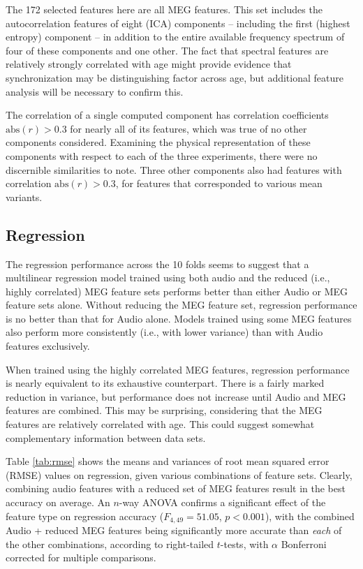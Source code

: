 \documentclass[a4paper]{article}
\begin{document}
The 172 selected features here are all MEG features. This set includes the autocorrelation features of eight (ICA) components -- including the first (highest entropy) component -- in addition to the entire available frequency spectrum of four of these components and one other. The fact that spectral features are relatively strongly correlated with age might provide evidence that synchronization may be distinguishing factor across age, but additional feature analysis will be necessary to confirm this. 

The correlation of a single computed component has correlation coefficients $\text{abs}(r)>0.3$ for nearly all of its features, which was true of no other components considered. Examining the physical representation of these components with respect to each of the three experiments, there were no discernible similarities to note. Three other components also had features with correlation $\text{abs}(r)>0.3$, for features that corresponded to various mean variants.

\subsection{Regression}

The regression performance across the 10 folds seems to suggest that a multilinear regression model trained using both audio and the reduced (i.e., highly correlated) MEG feature sets performs better than either Audio or MEG feature sets alone. Without  reducing the MEG feature set, regression performance is no better than that for Audio alone. Models trained using some MEG features also  perform more consistently (i.e., with lower variance) than with Audio features exclusively.

When trained using the highly correlated MEG features, regression performance is nearly equivalent to its exhaustive counterpart. There is a fairly marked reduction in variance, but performance does not increase until Audio and MEG features are combined. This may be surprising, considering that the MEG features are relatively correlated with age. This could suggest somewhat complementary information between data sets. %

Table \ref{tab:rmse} shows the means and variances of root mean squared error (RMSE) values on regression, given various combinations of feature sets. Clearly, combining audio features with a reduced set of MEG features result in the best accuracy on average. An $n$-way ANOVA confirms a significant effect of the feature type on regression accuracy ($F_{4,49} = 51.05$, $p<0.001$), with the combined Audio + reduced MEG features being significantly more accurate than {\em each} of the other combinations, according to right-tailed $t$-tests, with $\alpha$ Bonferroni corrected for multiple comparisons. 
\end{document}
